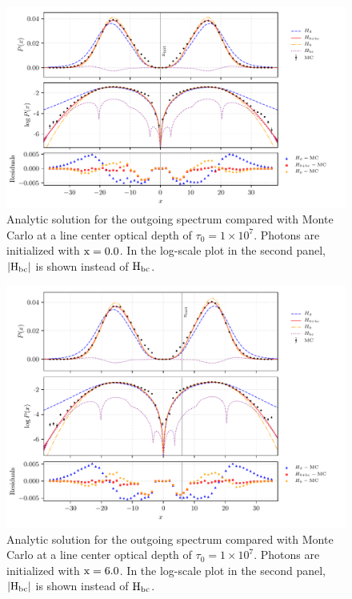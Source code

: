 \documentclass[onecolumn]{aastex63}
\begin{document}
\begin{figure}
    \centering
    \includegraphics{pdf_xinit0.pdf}
    \caption{Analytic solution for the outgoing spectrum compared with Monte Carlo at a line center optical depth of $\tau_0 = 1 \times 10^7$. Photons are initialized with $\rm x = 0.0$. In the log-scale plot in the second panel, $|\rm H_{bc}|$ is shown instead of $\rm H_{bc}$.} 
    \label{fig:sol_mc_residual_0}
\end{figure}

\begin{figure}
    \centering
    \includegraphics{pdf_xinit6.pdf}
    \caption{Analytic solution for the outgoing spectrum compared with Monte Carlo at a line center optical depth of $\tau_0 = 1 \times 10^7$. Photons are initialized with $\rm x = 6.0$. In the log-scale plot in the second panel, $|\rm H_{bc}|$ is shown instead of $\rm H_{bc}$.} 
    \label{fig:sol_mc_residual_6}
\end{figure}
\end{document}
